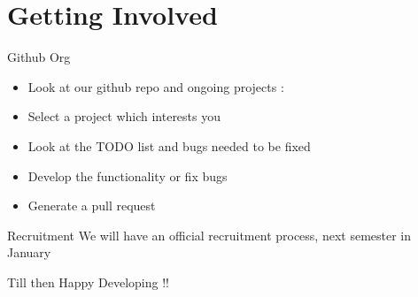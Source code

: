 \section{Getting Involved}
    \begin{frame}{Github Org}
        \begin{itemize}
            \item<+-> Look at our github repo and ongoing projects : 
            \item<+-> Select a project which interests you
            \item<+-> Look at the TODO list and bugs needed to be fixed
            \item<+-> Develop the functionality or fix bugs
            \item<+-> Generate a pull request
        \end{itemize}
    \end{frame}
    \begin{frame}{Recruitment}
        \uncover<+-> {We will have an official recruitment process, next semester in January\\ }
        \vspace{20px}
        \begin{center}
        \uncover<+-> { Till then Happy Developing !!}  
        \end{center}      
    \end{frame}



